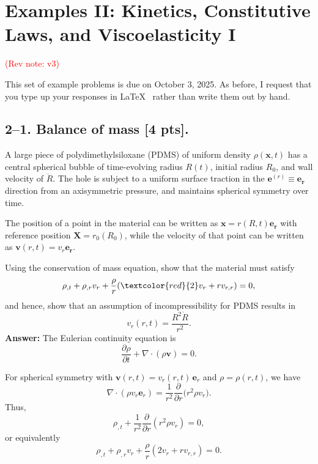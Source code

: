 \setcounter{section}{1} %


\section*{Examples II: Kinetics, Constitutive Laws, and Viscoelasticity I}
\label{PS2}
\textcolor{red}{(Rev note: v3)}


This set of example problems is due on October 3, 2025. 
As before, I request that you type up your responses in \LaTeX~ rather than write them out by hand. 

\medskip
\subsection*{2--1. \textbf{Balance of mass} [4 pts].} 
A large piece of polydimethylsiloxane (PDMS) of uniform density $\rho(\bm{x},t)$ has a central spherical bubble of time-evolving radius $R(t)$, initial radius $R_0$, and wall velocity of $\dot{R}$. 
The hole is subject to a uniform surface traction in the $\bm{e}^{(r)} \equiv \bm{e}_{\bm{r}}$ direction from an axisymmetric pressure, and maintains spherical symmetry over time. 

\medskip
The position of a point in the material can be written as $\bm{x} = r(R,t) \bm{e}_{\bm{r}}$ with reference position $\bm{X} = r_0(R_0)$, while the velocity of that point can be written as $\bm{v}(r,t) = v_r \bm{e}_{\bm{r}}$.

\medskip
Using the conservation of mass equation, show that the material must satisfy
\begin{equation*}
\rho_{,t}+ \rho_{,r} v_r + \frac{\rho}{r} (\textcolor{red}{2}v_r + r v_{r,r}) = 0,
\end{equation*}
and hence, show that an assumption of incompressibility for PDMS results in 
\begin{equation*}
v_r(r,t) = \frac{R^2 \dot{R}}{r^2}.
\end{equation*}
\medskip
\textbf{Answer:}
The Eulerian continuity equation is
$$
\frac{\partial \rho}{\partial t} + \nabla\!\cdot(\rho \bm v) = 0.
$$

For spherical symmetry with $\bm v(r,t) = v_r(r,t)\,\bm e_r$ and $\rho=\rho(r,t)$, we have
$$
\nabla \cdot (\rho v_r \bm e_r) = \frac{1}{r^2} \frac{\partial}{\partial r} \!\big( r^2 \rho v_r \big).
$$
Thus,
$$
\rho_{,t} + \frac{1}{r^2}\frac{\partial}{\partial r}(r^2 \rho v_r) = 0,
$$
or equivalently
$$
\rho_{,t} + \rho_{,r} v_r + \frac{\rho}{r}(2 v_r + r v_{r,r}) = 0.
$$

